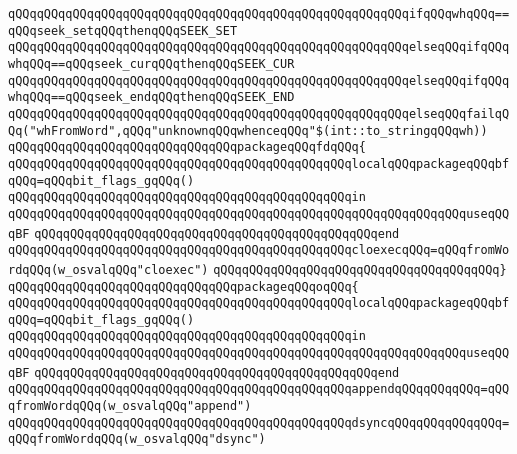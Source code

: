 \verb|qQQqqQQqqQQqqQQqqQQqqQQqqQQqqQQqqQQqqQQqqQQqqQQqqQQqqQQqifqQQqwhqQQq==qQQqseek_setqQQqthenqQQqSEEK_SET|\newline
\verb|qQQqqQQqqQQqqQQqqQQqqQQqqQQqqQQqqQQqqQQqqQQqqQQqqQQqqQQqelseqQQqifqQQqwhqQQq==qQQqseek_curqQQqthenqQQqSEEK_CUR|\newline
\verb|qQQqqQQqqQQqqQQqqQQqqQQqqQQqqQQqqQQqqQQqqQQqqQQqqQQqqQQqelseqQQqifqQQqwhqQQq==qQQqseek_endqQQqthenqQQqSEEK_END|\newline
\verb|qQQqqQQqqQQqqQQqqQQqqQQqqQQqqQQqqQQqqQQqqQQqqQQqqQQqqQQqelseqQQqfailqQQq("whFromWord",qQQq"unknownqQQqwhenceqQQq"$(int::to_stringqQQqwh))|\newline
\newline
\verb|qQQqqQQqqQQqqQQqqQQqqQQqqQQqqQQqpackageqQQqfdqQQq{|\newline
\newline
\verb|qQQqqQQqqQQqqQQqqQQqqQQqqQQqqQQqqQQqqQQqqQQqqQQqlocalqQQqpackageqQQqbfqQQq=qQQqbit_flags_gqQQq()|\newline
\verb|qQQqqQQqqQQqqQQqqQQqqQQqqQQqqQQqqQQqqQQqqQQqqQQqin|\newline
\verb|qQQqqQQqqQQqqQQqqQQqqQQqqQQqqQQqqQQqqQQqqQQqqQQqqQQqqQQqqQQqqQQquseqQQqBF|\newline
\verb|qQQqqQQqqQQqqQQqqQQqqQQqqQQqqQQqqQQqqQQqqQQqqQQqend|\newline
\newline
\verb|qQQqqQQqqQQqqQQqqQQqqQQqqQQqqQQqqQQqqQQqqQQqqQQqcloexecqQQq=qQQqfromWordqQQq(w_osvalqQQq"cloexec")|\newline
\verb|qQQqqQQqqQQqqQQqqQQqqQQqqQQqqQQqqQQqqQQq}|\newline
\newline
\verb|qQQqqQQqqQQqqQQqqQQqqQQqqQQqqQQqpackageqQQqoqQQq{|\newline
\newline
\verb|qQQqqQQqqQQqqQQqqQQqqQQqqQQqqQQqqQQqqQQqqQQqqQQqlocalqQQqpackageqQQqbfqQQq=qQQqbit_flags_gqQQq()|\newline
\verb|qQQqqQQqqQQqqQQqqQQqqQQqqQQqqQQqqQQqqQQqqQQqqQQqin|\newline
\verb|qQQqqQQqqQQqqQQqqQQqqQQqqQQqqQQqqQQqqQQqqQQqqQQqqQQqqQQqqQQqqQQquseqQQqBF|\newline
\verb|qQQqqQQqqQQqqQQqqQQqqQQqqQQqqQQqqQQqqQQqqQQqqQQqend|\newline
\newline
\verb|qQQqqQQqqQQqqQQqqQQqqQQqqQQqqQQqqQQqqQQqqQQqqQQqappendqQQqqQQqqQQq=qQQqfromWordqQQq(w_osvalqQQq"append")|\newline
\verb|qQQqqQQqqQQqqQQqqQQqqQQqqQQqqQQqqQQqqQQqqQQqqQQqdsyncqQQqqQQqqQQqqQQq=qQQqfromWordqQQq(w_osvalqQQq"dsync")|\newline

